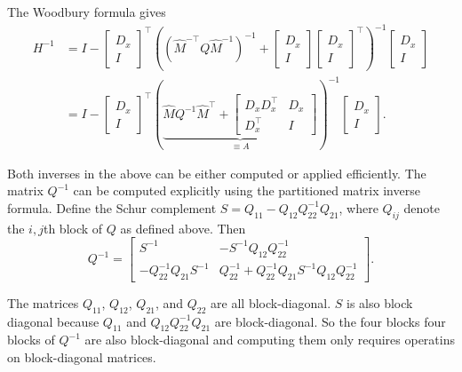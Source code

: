 \documentclass{article}
\begin{document}
The Woodbury formula gives
\begin{align}
  H^{-1} & = I -
  \begin{bmatrix}
    D_x \\ I
  \end{bmatrix}
  ^\top
  \left( \left(\hat{M}^{-\top} Q \hat{M}^{-1}\right)^{-1} +
    \begin{bmatrix}
      D_x \\ I
    \end{bmatrix}
    \begin{bmatrix}
      D_x \\ I
    \end{bmatrix}
    ^\top
  \right)^{-1}
  \begin{bmatrix}
    D_x \\ I
  \end{bmatrix}
  \nonumber      \\
  & = I -
  \begin{bmatrix}
    D_x \\ I
  \end{bmatrix}
  ^\top
  \left(\underbrace{
      \hat{M} Q^{-1} \hat{M}^\top
      +
      \begin{bmatrix}
        D_x D_x^\top & D_x \\
        D_x^\top     & I
      \end{bmatrix}
  }_{\equiv A}\right)^{-1}
  \begin{bmatrix}
    D_x \\ I
  \end{bmatrix}
  .
\end{align}

Both inverses in the above can be either computed or applied efficiently. The matrix $Q^{-1}$ can be computed
explicitly using the partitioned matrix inverse formula. Define the Schur complement $S = Q_{11} - Q_{12} Q_{22}^{-1}
Q_{21}$, where $Q_{ij}$ denote the $i,j$th block of $Q$ as defined above. Then
\begin{equation}
  Q^{-1} =
  \begin{bmatrix}
    S^{-1}                      & -S^{-1} Q_{12} Q_{22}^{-1}                                 \\
    - Q_{22}^{-1} Q_{21} S^{-1} & Q_{22}^{-1} + Q_{22}^{-1} Q_{21} S^{-1} Q_{12} Q_{22}^{-1}
  \end{bmatrix}
  .
\end{equation}

The matrices $Q_{11}$, $Q_{12}$, $Q_{21}$, and $Q_{22}$ are all block-diagonal. $S$ is also block diagonal because
$Q_{11}$ and $Q_{12} Q_{22}^{-1} Q_{21}$ are block-diagonal. So the four blocks four blocks of $Q^{-1}$ are also
block-diagonal and computing them only requires operatins on block-diagonal matrices.
\end{document}
